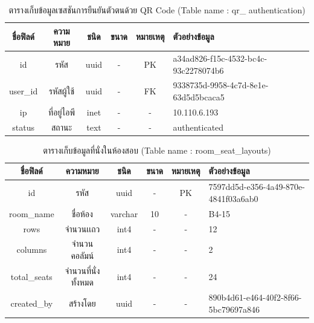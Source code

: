 \begin{table}[h!]
    \centering
    \caption{\fontSixTeen ตารางเก็บข้อมูลเซสชันการยืนยันตัวตนด้วย QR Code (Table name : qr\_  authentication)} 
    \label{tab3:qrauthentication}
    \fontSixTeen
    \begin{tabularx}{\textwidth}{| c | c | c | c | c | X |}    
        \hline
        \textbf{ชื่อฟิลด์} & \textbf{ความหมาย} & \textbf{ชนิด} & \textbf{ขนาด} & \textbf{หมายเหตุ} & \textbf{ตัวอย่างข้อมูล} \\
        \hline
        id & รหัส & uuid & - & PK & a34ad826-f15c-4532-bc4c-93c2278074b6 \\
        \hline
        user\_id & รหัสผู้ใช้ & uuid & - & FK & 9338735d-9958-4c7d-8e1e-63d5d5bcaca5 \\
        \hline
        ip & ที่อยู่ไอพี & inet & - & - & 10.110.6.193 \\
        \hline
        status & สถานะ & text & - & - & authenticated \\
        \hline
    \end{tabularx}
\end{table}

\begin{table}[h!]
    \centering
    \caption{\fontSixTeen ตารางเก็บข้อมูลที่นั่งในห้องสอบ (Table name : room\_seat\_layouts)}
    \label{tab3:roomseatlayouts1}
    \fontSixTeen 
    \begin{tabularx}{\textwidth}{| c | c | c | c | c | X |} 
    \hline
    \textbf{ชื่อฟิลด์} & \textbf{ความหมาย} & \textbf{ชนิด} & \textbf{ขนาด} & \textbf{หมายเหตุ} & \textbf{ตัวอย่างข้อมูล} \\
    \hline
    id & รหัส & uuid & - & PK & 7597dd5d-e356-4a49-870e-4841f03a6ab0 \\
    \hline
    room\_name & ชื่อห้อง & varchar & 10 & - & B4-15 \\
    \hline
    rows & จำนวนเเถว & int4 & - & - & 12 \\
    \hline
    columns & จำนวนคอลัมน์ & int4 & - & - & 2 \\
    \hline
    total\_seats & จำนวนที่นั่งทั้งหมด & int4 & - & - & 24 \\
    \hline
    created\_by & สร้างโดย & uuid & - & - & 890b4d61-e464-40f2-8f66-5bc79697a846 \\
    \hline
    \end{tabularx}
\end{table}



